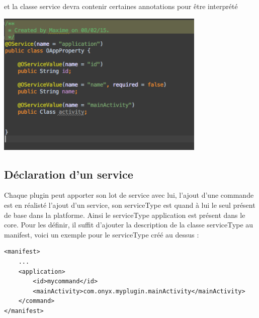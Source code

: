 et la classe service devra contenir certaines annotations pour être interprété

\includegraphics[width=10cm]{figures/newServiceType.png}

\subsection{Déclaration d'un service}

Chaque plugin peut apporter son lot de service avec lui, l'ajout d'une commande est en réalisté l'ajout d'un service, son serviceType est quand à lui le seul présent de base dans la platforme. Ainsi le serviceType application est présent dans le core. Pour les définir, il suffit d'ajouter la description de la classe serviceType au manifest, voici un exemple pour le serviceType créé au dessus : 

\begin{verbatim}
<manifest>
    ...
    <application>
        <id>mycommand</id>
        <mainActivity>com.onyx.myplugin.mainActivity</mainActivity>
    </command>
</manifest>
\end{verbatim}